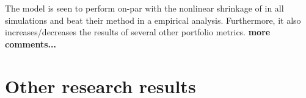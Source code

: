 \documentclass[oneside]{book}\usepackage{knitr}
\begin{document}
The model is seen to perform on-par with the nonlinear shrinkage of \citet{lw20} in all simulations and beat their method in a empirical analysis.
Furthermore, it also increases/decreases the results of several other portfolio metrics.
\textbf{more comments...}


\section{Other research results}
\end{document}
